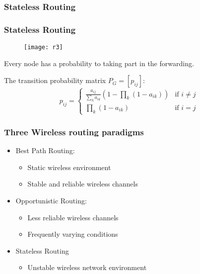 \documentclass[xcolor=dvipsnames]{beamer}
\begin{document}
\subsubsection{Stateless Routing}
\begin{frame}
\frametitle{Stateless Routing}
\begin{figure}
\begin{center}
  \texttt{[image: r3]}
\end{center}
\end{figure}
\begin{center}
Every node has a probability to taking part in the forwarding.
\end{center}
The transition probability matrix $P_{G}=[p_{ij}]$:
\begin{equation}
p_{ij} = \left\{ \begin{array}{ll}
\frac{a_{ij}}{\sum_{k}a_{ik}}(1-\prod_{k}(1-a_{ik})) & \textrm{if $i\not= j$}\\
\prod_{k}(1-a_{ik}) & \textrm{if $i=j$}
\end{array} \right.
\end{equation}
\end{frame}

\begin{frame}
\frametitle{Three Wireless routing paradigms}
\begin{itemize}
\item<1-> Best Path Routing:
\begin{itemize}
\item Static wireless environment
\item Stable and reliable wireless channels
\end{itemize}
\item<2-> Opportunistic Routing:
\begin{itemize}
\item Less reliable wireless channels
\item Frequently varying conditions
\end{itemize}
\item<3-> Stateless Routing
\begin{itemize}
\item Unstable wireless network environment
\end{itemize}
\end{itemize}
\end{frame}
\end{document}
